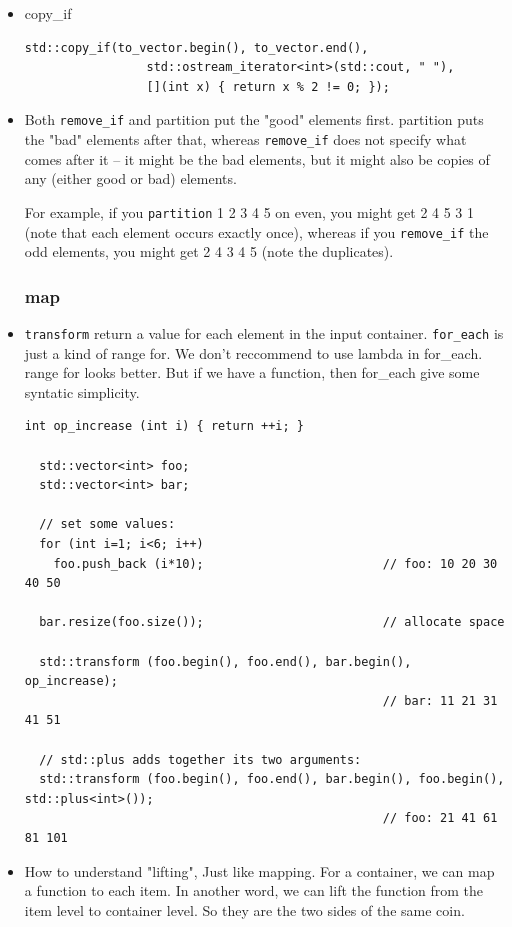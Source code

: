 \documentclass[a4paper,11pt,twoside]{book}
\begin{document}
\begin{itemize}
	\item copy\_if
\begin{lstlisting}
std::copy_if(to_vector.begin(), to_vector.end(),
                 std::ostream_iterator<int>(std::cout, " "),
                 [](int x) { return x % 2 != 0; });
\end{lstlisting}
	
	\item  Both \texttt{remove\_if} and partition put the "good" elements first. partition puts the "bad" elements after that, whereas \texttt{remove\_if} does not specify what comes after it -- it might be the bad elements, but it might also be copies of any (either good or bad) elements.
	
	For example, if you \texttt{partition} 1 2 3 4 5 on even, you might get 2 4 5 3 1 (note that each element occurs exactly once), whereas if you \texttt{remove\_if} the odd elements, you might get 2 4 3 4 5 (note the duplicates).
	
\subsubsection{map}
	\item \texttt{transform} return a value for each element in the input container. \texttt{for\_each} is just a kind of range for. We don't reccommend to use lambda in for\_each.  range for looks better.  But if we have a function, then for\_each give some syntatic simplicity. 
\begin{lstlisting}
int op_increase (int i) { return ++i; }

  std::vector<int> foo;
  std::vector<int> bar;

  // set some values:
  for (int i=1; i<6; i++)
    foo.push_back (i*10);                         // foo: 10 20 30 40 50

  bar.resize(foo.size());                         // allocate space

  std::transform (foo.begin(), foo.end(), bar.begin(), op_increase);
                                                  // bar: 11 21 31 41 51

  // std::plus adds together its two arguments:
  std::transform (foo.begin(), foo.end(), bar.begin(), foo.begin(), std::plus<int>());
                                                  // foo: 21 41 61 81 101
\end{lstlisting}
\item How to understand "lifting", Just like mapping. For a container, we can map a function to each item. In another word, we can lift the function from the item level to container level. So they are the two sides of the same coin. 	
\end{itemize}
\end{document}
